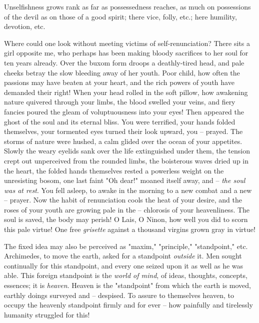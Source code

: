 \documentclass[a4paper]{book}
\begin{document}
Unselfishness grows rank as far as possessedness reaches, as much on 
possessions of the devil as on those of a good spirit; there vice, folly, 
etc.; here humility, devotion, etc.

Where could one look without meeting victims of self-renunciation? There sits 
a girl opposite me, who perhaps has been making bloody sacrifices to her soul 
for ten years already. Over the buxom form droops a deathly-tired head, and 
pale cheeks betray the slow bleeding away of her youth. Poor child, how often 
the passions may have beaten at your heart, and the rich powers of youth have 
demanded their right! When your head rolled in the soft pillow, how awakening 
nature quivered through your limbs, the blood swelled your veins, and fiery 
fancies poured the gleam of voluptuousness into your eyes! Then appeared the 
ghost of the soul and its eternal bliss. You were terrified, your hands folded 
themselves, your tormented eyes turned their look upward, you -- prayed. The 
storms of nature were hushed, a calm glided over the ocean of your appetites. 
Slowly the weary eyelids sank over the life extinguished under them, the 
tension crept out unperceived from the rounded limbs, the boisterous waves 
dried up in the heart, the folded hands themselves rested a powerless weight 
on the unresisting bosom, one last faint "{}Oh dear!"{} moaned itself away, 
and -- \textit{the soul was at rest}. You fell asleep, to awake in the morning 
to a new combat and a new -- prayer. Now the habit of renunciation cools the 
heat of your desire, and the roses of your youth are growing pale in the -- 
chlorosis of your heavenliness. The soul is saved, the body may perish! O 
Lais, O Ninon, how well you did to scorn this pale virtue! One free 
\textit{grisette} against a thousand virgins grown gray in virtue!

The fixed idea may also be perceived as "{}maxim,"{} "{}principle,"{} 
"{}standpoint,"{} etc. Archimedes, to move the earth, asked for a standpoint 
\textit{outside} it. Men sought continually for this standpoint, and every one 
seized upon it as well as he was able. This foreign standpoint is the 
\textit{world of mind}, of ideas, thoughts, concepts, essences; it is 
\textit{heaven}. Heaven is the "{}standpoint"{} from which the earth is moved, 
earthly doings surveyed and -- despised. To assure to themselves heaven, to 
occupy the heavenly standpoint firmly and for ever -- how painfully and 
tirelessly humanity struggled for this!
\end{document}
